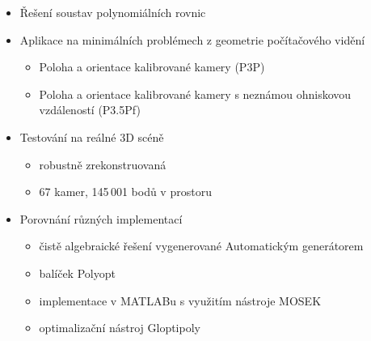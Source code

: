 \documentclass[cmpiitalkstyle, 22pt]{cmptalk}
\begin{document}
\begin{cmptalkslide}[Experimenty]
  \begin{itemize}
    \item Řešení soustav polynomiálních rovnic
    \item Aplikace na minimálních problémech z geometrie počítačového vidění
    \begin{itemize}
      \item Poloha a orientace kalibrované kamery (P3P)
      \item Poloha a orientace kalibrované kamery s neznámou ohniskovou vzdáleností (P3.5Pf)
    \end{itemize}
    \item Testování na reálné 3D scéně
    \begin{itemize}
      \item robustně zrekonstruovaná
      \item 67 kamer, 145\,001 bodů v prostoru
    \end{itemize}
    \item Porovnání různých implementací
    \begin{itemize}
      \item čistě algebraické řešení vygenerované Automatickým generátorem \cite{AutoGen}
      \item balíček Polyopt
      \item implementace v MATLABu s využitím nástroje MOSEK \cite{mosek}
      \item optimalizační nástroj Gloptipoly \cite{gloptipoly}
    \end{itemize}
  \end{itemize}


\end{cmptalkslide}
\end{document}
